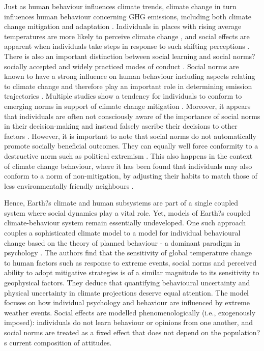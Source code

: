 \documentclass[10pt,letterpaper]{article}
\begin{document}
Just as human behaviour influences climate trends, climate change in turn influences human behaviour concerning GHG emissions, including both climate change mitigation and adaptation \cite{castree14,clayton15,baird14,weber10,howe13}. Individuals in places with rising average temperatures are more likely to perceive climate change \cite{howe13}, and social effects are apparent when individuals take steps in response to such shifting perceptions \cite{clayton15,baird14}. There is also an important distinction between social learning and social norms?socially accepted and widely practiced modes of conduct \cite{allcott11}. Social norms are known to have a strong influence on human behaviour \cite{cialdini91} including aspects relating to climate change \cite{bollinger12,allcott11,nolan08} and therefore play an important role in determining emission trajectories \cite{clayton15}. Multiple studies show a tendency for individuals to conform to emerging norms in support of climate change mitigation \cite{bollinger12,allcott11}. Moreover, it appears that individuals are often not consciously aware of the importance of social norms in their decision-making and instead falsely ascribe their decisions to other factors \cite{nolan08}. However, it is important to note that social norms do not automatically promote socially beneficial outcomes. They can equally well force conformity to a destructive norm such as political extremism \cite{smith14}. This also happens in the context of climate change behaviour, where it has been found that individuals may also conform to a norm of non-mitigation, by adjusting their habits to match those of less environmentally friendly neighbours \cite{nolan08,stoll01}.

Hence, Earth?s climate and human subsystems are part of a single coupled system where social dynamics play a vital role. Yet, models of Earth?s coupled climate-behaviour system remain essentially undeveloped. One such approach \cite{beckage18} couples a sophisticated climate model \cite{sterman12} to a model for individual behavioural change based on the theory of planned behaviour - a dominant paradigm in psychology \cite{ajzen91}. The authors find that the sensitivity of global temperature change to human factors such as response to extreme events, social norms and perceived ability to adopt mitigative strategies is of a similar magnitude to its sensitivity to geophysical factors. They deduce that quantifying behavioural uncertainty and physical uncertainty in climate projections deserve equal attention. The model focuses on how individual psychology and behaviour are influenced by extreme weather events. Social effects are modelled phenomenologically (i.e., exogenously imposed): individuals do not learn behaviour or opinions from one another, and social norms are treated as a fixed effect that does not depend on the population?s current composition of attitudes.
\end{document}
